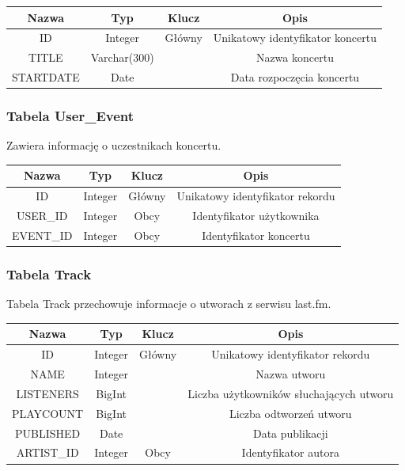\documentclass[10pt,a4paper]{article}
\begin{document}
\begin{table}[H]
  \centering
    \begin{tabular}{cccc}
    \addlinespace
    \toprule
    Nazwa & Typ   & Klucz & Opis \\
    \midrule
    ID    & Integer & Główny & Unikatowy identyfikator koncertu \\
    TITLE & Varchar(300) &       & Nazwa koncertu \\
    STARTDATE & Date  &       & Data rozpoczęcia koncertu \\
    \bottomrule
    \end{tabular}
  \label{tab:addlabel}
\end{table}

\subsubsection {Tabela User\_Event}
Zawiera informację o uczestnikach koncertu.

\begin{table}[H]
  \centering
    \begin{tabular}{cccc}
    \addlinespace
    \toprule
    Nazwa & Typ   & Klucz & Opis \\
    \midrule
    ID    & Integer & Główny & Unikatowy identyfikator rekordu \\
    USER\_ID & Integer & Obcy  & Identyfikator użytkownika \\
    EVENT\_ID & Integer & Obcy  & Identyfikator koncertu \\
    \bottomrule
    \end{tabular}
  \label{tab:addlabel}
\end{table}

\subsubsection {Tabela Track}
Tabela Track przechowuje informacje o utworach z serwisu last.fm.

\begin{table}[H]
  \centering
    \begin{tabular}{cccc}
    \addlinespace
    \toprule
    Nazwa & Typ   & Klucz & Opis \\
    \midrule
    ID    & Integer & Główny & Unikatowy identyfikator rekordu \\
    NAME  & Integer &       & Nazwa utworu \\
    LISTENERS & BigInt &       & Liczba użytkowników słuchających utworu \\
    PLAYCOUNT & BigInt &       & Liczba odtworzeń utworu \\
    PUBLISHED & Date  &       & Data publikacji \\
    ARTIST\_ID & Integer & Obcy  & Identyfikator autora \\
    \bottomrule
    \end{tabular}
  \label{tab:addlabel}
\end{table}
\end{document}
